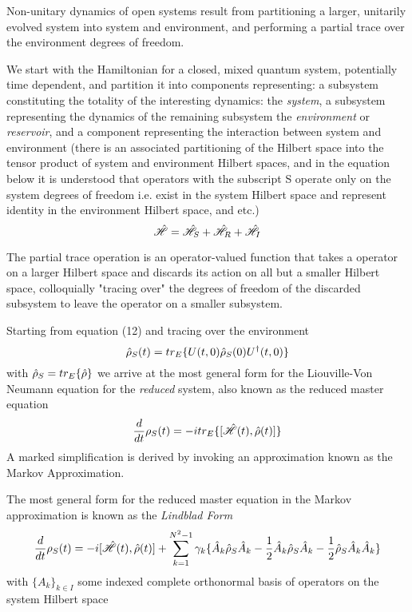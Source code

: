 Non-unitary dynamics of open systems result from partitioning a larger, unitarily evolved system into system and environment, and performing a partial trace over the environment degrees of freedom.

We start with the Hamiltonian for a closed, mixed quantum system, potentially time dependent, and partition it into components representing: a subsystem constituting the totality of the interesting dynamics: the \emph{system}, a subsystem representing the dynamics of the remaining subsystem the \emph{environment} or \emph{reservoir}, and a component representing the interaction between system and environment (there is an associated partitioning of the Hilbert space into the tensor product of system and environment Hilbert spaces, and in the equation below it is understood that operators with the subscript S operate only on the system degrees of freedom i.e. exist in the system Hilbert space and represent identity in the environment Hilbert space, and etc.)
\begin{equation}
	\hat{\mathscr{H}} = \hat{\mathscr{H}}_S +\hat{\mathscr{H}}_R + \hat{\mathscr{H}}_I
\end{equation}

The partial trace operation is an operator-valued function that takes a operator on a larger Hilbert space and discards its action on all but a smaller Hilbert space, colloquially "tracing over" the degrees of freedom of the discarded subsystem to leave the operator on a smaller subsystem.

Starting from equation (12) and tracing over the environment
\begin{equation}
	\hat{\rho}_S (t) = tr_E \{U(t, 0) \hat{\rho}_S (0) U^\dagger (t, 0) \}
\end{equation}
with $\hat{\rho}_S = tr_E\{\hat{\rho}\}$ we arrive at the most general form for the Liouville-Von Neumann equation for the \emph{reduced} system, also known as the reduced master equation
\begin{equation}
	\frac{d}{dt} \rho_S (t) = -itr_E\{[\hat{\mathscr{H}}(t), \hat{\rho}(t)]\}
\end{equation}
A marked simplification is derived by invoking an approximation known as the Markov Approximation. 

The most general form\autocite[119--122]{Breuer2002} for the reduced master equation in the Markov approximation is known as the \emph{Lindblad Form}
\begin{equation}
	\frac{d}{dt} \rho_S (t) = -i[\hat{\mathscr{H}} (t), \hat{\rho} (t)] + \sum_{k=1}^{N^2-1} \gamma_k \{ \hat{A}_k \hat{\rho}_S \hat{A}_k -\frac{1}{2}  \hat{A}_k \hat{\rho}_S \hat{A}_k -\frac{1}{2} \hat{\rho}_S \hat{A}_k \hat{A}_k \}
\end{equation} 
with $\{A_k\}_{k \in I}$ some indexed complete orthonormal basis of operators on the system Hilbert space

